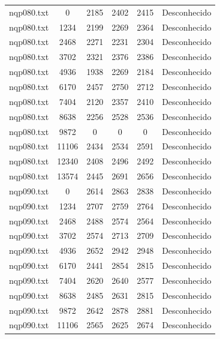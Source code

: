 \documentclass[12pt]{article}
\begin{document}
{\begin{longtable}{c|c|cccc}
		nqp080.txt    &   0       &   2185   &   2402   &   2415   & Desconhecido \\
		nqp080.txt    &   1234    &   2199   &   2269   &   2364   & Desconhecido \\
		nqp080.txt    &   2468    &   2271   &   2231   &   2304   & Desconhecido \\
		nqp080.txt    &   3702    &   2321   &   2376   &   2386   & Desconhecido \\
		nqp080.txt    &   4936    &   1938   &   2269   &   2184   & Desconhecido \\
		nqp080.txt    &   6170    &   2457   &   2750   &   2712   & Desconhecido \\
		nqp080.txt    &   7404    &   2120   &   2357   &   2410   & Desconhecido \\
		nqp080.txt    &   8638    &   2256   &   2528   &   2536   & Desconhecido \\
		nqp080.txt    &   9872    &   0      &   0      &   0      & Desconhecido \\
		nqp080.txt    &   11106   &   2434   &   2534   &   2591   & Desconhecido \\
		nqp080.txt    &   12340   &   2408   &   2496   &   2492   & Desconhecido \\
		nqp080.txt    &   13574   &   2445   &   2691   &   2656   & Desconhecido \\ \hline
		nqp090.txt    &   0       &   2614   &   2863   &   2838   & Desconhecido \\
		nqp090.txt    &   1234    &   2707   &   2759   &   2764   & Desconhecido \\
		nqp090.txt    &   2468    &   2488   &   2574   &   2564   & Desconhecido \\
		nqp090.txt    &   3702    &   2574   &   2713   &   2709   & Desconhecido \\
		nqp090.txt    &   4936    &   2652   &   2942   &   2948   & Desconhecido \\
		nqp090.txt    &   6170    &   2441   &   2854   &   2815   & Desconhecido \\
		nqp090.txt    &   7404    &   2620   &   2640   &   2577   & Desconhecido \\
		nqp090.txt    &   8638    &   2485   &   2631   &   2815   & Desconhecido \\
		nqp090.txt    &   9872    &   2642   &   2878   &   2881   & Desconhecido \\
		nqp090.txt    &   11106   &   2565   &   2625   &   2674   & Desconhecido \\

\end{longtable}}
\end{document}
